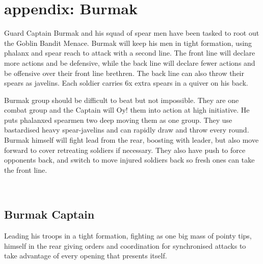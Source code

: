 \clearpage
\section*{appendix: Burmak}
\label{appendixburmak}

\raggedbottom

Guard Captain Burmak and his squad of spear men have been tasked to root out the Goblin Bandit Menace. Burmak will keep his men in tight formation, using phalanx and spear reach to attack with a second line. The front line will declare more actions and be defensive, while the back line will declare fewer actions and be offensive over their front line brethren. The back line can also throw their spears as javelins. Each soldier carries 6x extra spears in a quiver on his back.

Burmak group should be difficult to beat but not impossible. They are one combat group and the Captain will Oy! them into action at high initiative. He puts phalanxed spearmen two deep moving them as one group. They use bastardised heavy spear-javelins and can rapidly draw and throw every round. Burmak himself will fight lead from the rear, boosting with leader, but also move forward to cover retreating soldiers if necessary. They also have push to force opponents back, and switch to move injured soldiers back so fresh ones can take the front line.

\


\subsection*{Burmak Captain}

Leading his troops in a tight formation, fighting as one big mass of pointy tips, himself in the rear giving orders and coordination for synchronised attacks to take advantage of every opening that presents itself.

\

